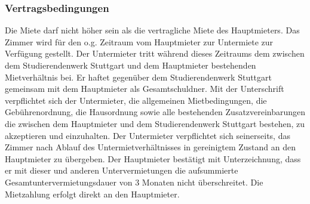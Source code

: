 \documentclass[9pt,pdftex,a4paper]{article}
\begin{document}
\subsubsection*{Vertragsbedingungen}
Die Miete darf nicht höher sein als die vertragliche Miete des Hauptmieters.
Das Zimmer wird für den o.g. Zeitraum vom Hauptmieter zur Untermiete zur Verfügung gestellt.
Der Untermieter tritt während dieses Zeitraums dem zwischen dem Studierendenwerk Stuttgart und dem Hauptmieter bestehenden Mietverhältnis bei.
Er haftet gegenüber dem Studierendenwerk Stuttgart gemeinsam mit dem Hauptmieter als Gesamtschuldner.
Mit der Unterschrift verpflichtet sich der Untermieter, die allgemeinen Mietbedingungen, die Gebührenordnung, die Hausordnung sowie alle bestehenden Zusatzvereinbarungen die zwischen dem Hauptmieter und dem Studierendenwerk Stuttgart bestehen, zu akzeptieren und einzuhalten.
Der Untermieter verpflichtet sich seinerseits, das Zimmer nach Ablauf des Untermietverhältnisses in gereinigtem Zustand an den Hauptmieter zu übergeben.
Der Hauptmieter bestätigt mit Unterzeichnung, dass er mit dieser und anderen Untervermietungen die aufsummierte Gesamtuntervermietungsdauer von 3 Monaten nicht überschreitet.
Die Mietzahlung erfolgt direkt an den  Hauptmieter.
\end{document}

